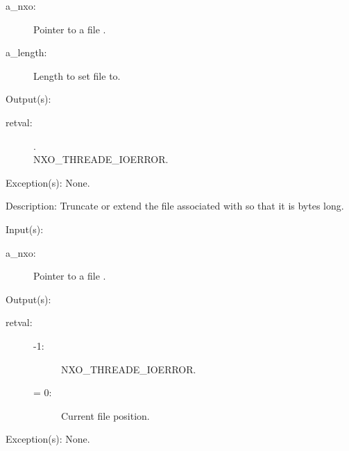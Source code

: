 \begin{capi}
\begin{capilist}
		\begin{description}\item[]
		\item[a\_nxo: ]
			Pointer to a file .
		\item[a\_length: ]
			Length to set file to.
		\end{description}
	\item[Output(s): ]
		\begin{description}\item[]
		\item[retval: ]
			\begin{description}\item[]
			\item[.]
			\item[
				{NXO_THREADE_IOERROR}.]
			\end{description}
		\end{description}
	\item[Exception(s): ] None.
	\item[Description: ]
		Truncate or extend the file associated with  so
		that it is  bytes long.
	\end{capilist}
\label{nxo_file_position_get}
	\begin{capilist}
	\item[Input(s): ]
		\begin{description}\item[]
		\item[a\_nxo: ]
			Pointer to a file .
		\end{description}
	\item[Output(s): ]
		\begin{description}\item[]
		\item[retval: ]
			\begin{description}\item[]
			\item[-1: ]
				{NXO_THREADE_IOERROR}.
			\item[{\gt}= 0: ]
				Current file position.
			\end{description}\item[]
		\end{description}
	\item[Exception(s): ] None.

\end{capilist}
\end{capi}

